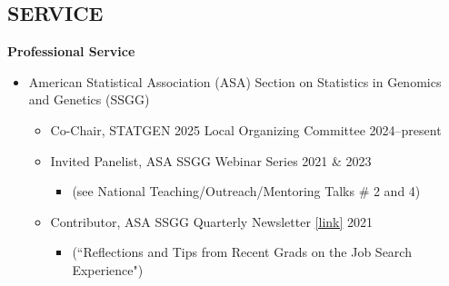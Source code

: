 \documentclass[margin]{res}
\begin{document}
\begin{resume}
\section{SERVICE}  

\textbf{Professional Service}
	\begin{itemize}
	
	\item American Statistical Association (ASA) Section on Statistics in Genomics and Genetics (SSGG)
		\begin{itemize}
		\item Co-Chair, STATGEN 2025 Local Organizing Committee \hfill 2024--present
		\item Invited Panelist, ASA SSGG Webinar Series \hfill 2021 \& 2023 
			\begin{itemize}[leftmargin=-0in] \vspace{-0.2cm}
			\item[] \begin{footnotesize}(see National Teaching/Outreach/Mentoring Talks \# 2 and 4) \end{footnotesize}
			\end{itemize} %
		\item Contributor, ASA SSGG Quarterly Newsletter \href{https://higherlogicdownload.s3.amazonaws.com/AMSTAT/6d11267c-5862-4c31-9f1e-f5a52a11ea5f/UploadedImages/Newsletters/Newsletter_SSGG_2021Sept_final.pdf}{[link]} \hfill 2021
			\begin{itemize}[leftmargin=-0in] \vspace{-0.2cm}
			\item[]  \begin{footnotesize}(``Reflections and Tips from Recent Grads on the Job Search Experience") \end{footnotesize}
			\end{itemize} %
		\end{itemize}
		

\end{itemize}
\end{resume}
\end{document}
